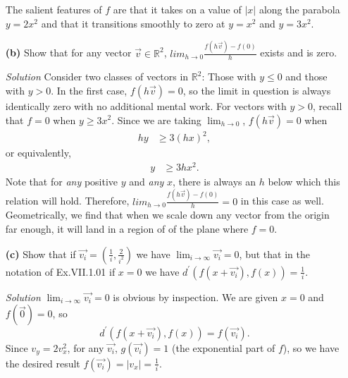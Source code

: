 \documentclass[11pt]{article}
\begin{document}
\begin{itemize}
  The salient features of $f$ are that it takes on a value of $|x|$ along the
  parabola $y = 2x^2$ and that it transitions smoothly to zero at $y = x^2$ and $y
  = 3x^2$.
  
\item[\textbf{(b)}]
  Show that for any vector $\vec{v} \in \mathbb{R}^2$,
  $lim_{h\to0}\frac{f(h\vec{v}) - f(0)}{h}$ exists and is zero.
\item[\emph{Solution}] Consider two classes of vectors in $\mathbb{R}^2$: Those
  with $y \le 0$ and those with $y > 0$.  In the first case, $f(h\vec{v}) = 0$, so
  the limit in question is always identically zero with no additional mental work.
  For vectors with $y > 0$, recall that $f=0$ when $y \ge 3x^2$.  Since we are
  taking $\lim_{h\to0}$, $f(h\vec{v}) = 0$ when
  \begin{align*}
    hy &\ge 3(hx)^2,
  \end{align*}
  or equivalently,
  \begin{align*}
    y  &\ge 3hx^2.
  \end{align*}
  Note that for \emph{any} positive $y$ and \emph{any} $x$, there is always an $h$
  below which this relation will hold.  Therefore, $lim_{h\to0}\frac{f(h\vec{v}) -
    f(0)}{h} = 0$ in this case as well.  Geometrically, we find that when we scale
  down any vector from the origin far enough, it will land in a region of of the
  plane where $f = 0$.

\item[\textbf{(c)}] Show that if $\vec{v_i} = (\frac{1}{i}, \frac{2}{i^2})$ we have
  $\lim_{i\to\infty}\vec{v_i} = 0$, but that in the notation of Ex.VII.1.01 if $x =
  0$ we have $d^\prime(f(x+\vec{v_i}),f(x)) = \frac{1}{i}$.
\item[\emph{Solution}] $\lim_{i\to\infty}\vec{v_i} = 0$ is obvious by
  inspection. We are given $x=0$ and$f(\vec{0}) = 0$, so
  \[d^\prime(f(x+\vec{v_i}),f(x)) = f(\vec{v_i}).\]  Since $v_y = 2v_x^2$, for any
  $\vec{v_i}$, $g(\vec{v_i}) = 1$ (the exponential part of $f$), so we have the
  desired result $f(\vec{v_i}) = |v_x| = \frac{1}{i}$.

 \newpage
  

\end{itemize}
\end{document}
